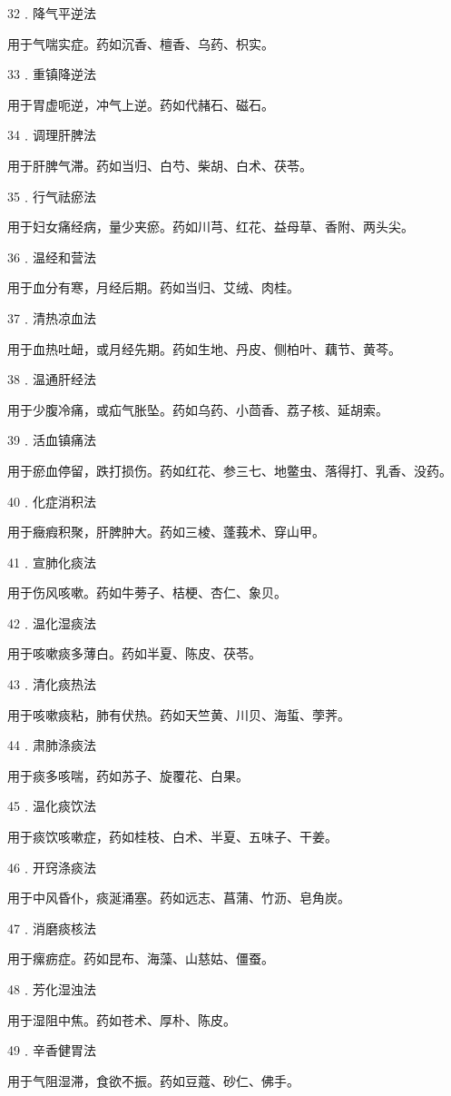 \documentclass[a4paper,12pt,UTF8,twoside]{ctexbook}
\begin{document}
32﹒降气平逆法

用于气喘实症。药如沉香、檀香、乌药、枳实。

33﹒重镇降逆法

用于胃虚呃逆，冲气上逆。药如代赭石、磁石。

34﹒调理肝脾法

用于肝脾气滞。药如当归、白芍、柴胡、白术、茯苓。

35﹒行气祛瘀法

用于妇女痛经病，量少夹瘀。药如川芎、红花、益母草、香附、两头尖。

36﹒温经和营法

用于血分有寒，月经后期。药如当归、艾绒、肉桂。

37﹒清热凉血法

用于血热吐衄，或月经先期。药如生地、丹皮、侧柏叶、藕节、黄芩。

38﹒温通肝经法

用于少腹冷痛，或疝气胀坠。药如乌药、小茴香、荔子核、延胡索。

39﹒活血镇痛法

用于瘀血停留，跌打损伤。药如红花、参三七、地鳖虫、落得打、乳香、没药。

40﹒化症消积法

用于癥瘕积聚，肝脾肿大。药如三棱、蓬莪术、穿山甲。

41﹒宣肺化痰法

用于伤风咳嗽。药如牛蒡子、桔梗、杏仁、象贝。

42﹒温化湿痰法

用于咳嗽痰多薄白。药如半夏、陈皮、茯苓。

43﹒清化痰热法

用于咳嗽痰粘，肺有伏热。药如天竺黄、川贝、海蜇、荸荠。

44﹒肃肺涤痰法

用于痰多咳喘，药如苏子、旋覆花、白果。

45﹒温化痰饮法

用于痰饮咳嗽症，药如桂枝、白术、半夏、五味子、干姜。

46﹒开窍涤痰法

用于中风昏仆，痰涎涌塞。药如远志、菖蒲、竹沥、皂角炭。

47﹒消磨痰核法

用于瘰疬症。药如昆布、海藻、山慈姑、僵蚕。

48﹒芳化湿浊法

用于湿阻中焦。药如苍术、厚朴、陈皮。

49﹒辛香健胃法

用于气阻湿滞，食欲不振。药如豆蔻、砂仁、佛手。
\end{document}
